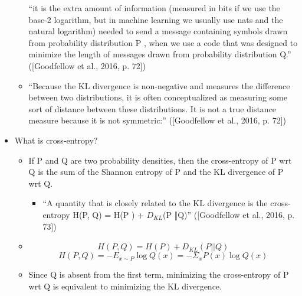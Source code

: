 \documentclass{../template/texnote}
\begin{document}
\begin{itemize}
\begin{itemize}
    “it is the extra amount of information (measured in bits if we use the base-2 logarithm, but in machine learning we usually use nats and the natural logarithm) needed to send a message containing symbols drawn from probability distribution P , when we use a code that was designed to minimize the length of messages drawn from probability distribution Q.” ([Goodfellow et al., 2016, p. 72])
\item 
    “Because the KL divergence is non-negative and measures the difference between two distributions, it is often conceptualized as measuring some sort of distance between these distributions. It is not a true distance measure because it is not symmetric:” ([Goodfellow et al., 2016, p. 72])  
	\end{itemize}
\item
	What is cross-entropy?\label{cross-entropy}
	\begin{itemize}
		\item 
    If P and Q are two probability densities, then the cross-entropy of P wrt Q is the sum of the Shannon entropy of P and the KL divergence of P wrt Q.
    	\begin{itemize}
    		\item 
			“A quantity that is closely related to the KL divergence is the cross-entropy H(P, Q) = H(P ) + $D_{KL}$(P ‖Q)” ([Goodfellow et al., 2016, p. 73])
    	\end{itemize}
\item $$H(P,Q) = H(P) + D_{KL} (P || Q)$$
        $$ H(P,Q) = -E_{x\sim P} \log Q(x) = -\Sigma_x P(x) \log Q(x)$$
\item 
    Since Q is absent from the first term, minimizing the cross-entropy of P wrt Q is equivalent to minimizing the KL divergence.
	\end{itemize}
	\end{itemize}
    \printbibliography
\end{document}
